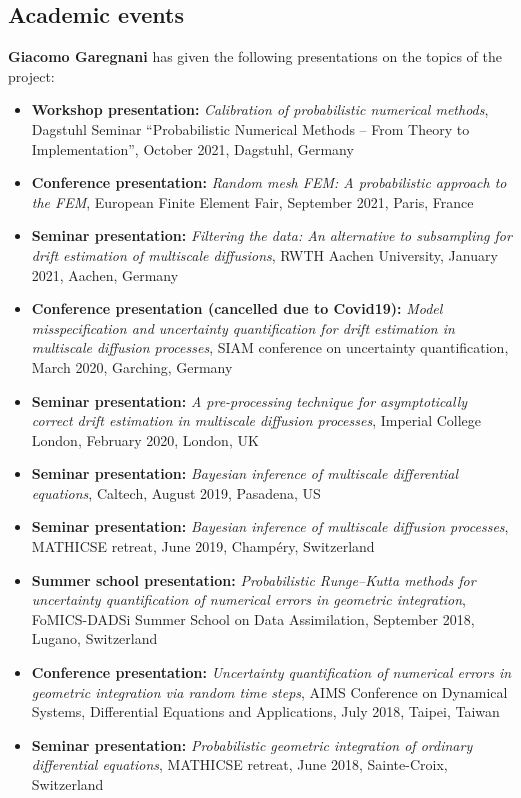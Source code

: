 \documentclass[10pt]{article}
\begin{document}
\subsection{Academic events}

\textbf{Giacomo Garegnani} has given the following presentations on the topics of the project:
\begin{itemize}
	\item \textbf{Workshop presentation:} \textit{Calibration of probabilistic numerical methods}, Dagstuhl Seminar ``Probabilistic Numerical Methods -- From Theory to Implementation'', October 2021, Dagstuhl, Germany
	\item \textbf{Conference presentation:} \textit{Random mesh FEM: A probabilistic approach to the FEM}, European Finite Element Fair, September 2021, Paris, France
	\item \textbf{Seminar presentation:} \textit{Filtering the data: An alternative to subsampling for drift estimation of multiscale diffusions}, RWTH Aachen University, January 2021, Aachen, Germany
	\item \textbf{Conference presentation (cancelled due to Covid19):} \textit{Model misspecification and uncertainty quantification for drift estimation in multiscale diffusion processes}, SIAM conference on uncertainty quantification, March 2020, Garching, Germany
	\item \textbf{Seminar presentation:} \textit{A pre-processing technique for asymptotically correct drift estimation in multiscale diffusion processes}, Imperial College London, February 2020, London, UK
	\item \textbf{Seminar presentation:} \textit{Bayesian inference of multiscale differential equations}, Caltech, August 2019, Pasadena, US
	\item \textbf{Seminar presentation:} \textit{Bayesian inference of multiscale diffusion processes}, MATHICSE retreat, June 2019, Champéry, Switzerland
	\item \textbf{Summer school presentation:} \textit{Probabilistic Runge--Kutta methods	for uncertainty quantification of numerical errors in geometric integration}, FoMICS-DADSi Summer School on Data Assimilation, September 2018,  Lugano, Switzerland
	\item \textbf{Conference presentation:} \textit{Uncertainty quantification of numerical errors in geometric integration via random time steps}, AIMS Conference on Dynamical Systems, Differential Equations and Applications, July 2018, Taipei, Taiwan
	\item \textbf{Seminar presentation:} \textit{Probabilistic geometric integration of ordinary differential equations}, MATHICSE retreat, June 2018, Sainte-Croix, Switzerland

\end{itemize}
\end{document}
